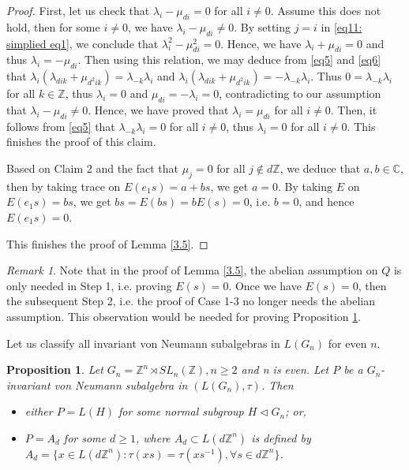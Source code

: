 \documentclass[12pt]{amsart}
\newtheorem{prop}[theorem]{Proposition}
\theoremstyle{definition}
\theoremstyle{remark}
\newtheorem{remark}[theorem]{Remark}
\begin{document}
\begin{proof}
First, let us check that $\lambda_i-\mu_{di}=0$ for all $i\neq 0$. Assume this does not hold, then for some $i\neq 0$, we have $\lambda_i-\mu_{di}\neq 0$. By setting $j=i$ in \eqref{eq11: simplied eq1}, we conclude that $\lambda_i^2-\mu_{di}^2=0$. Hence, we have $\lambda_i+\mu_{di}=0$ and thus $\lambda_i=-\mu_{di}$. Then using this relation, we may deduce from \eqref{eq5} and \eqref{eq6} that
$\lambda_i(\lambda_{dik}+\mu_{d^2ik})=\lambda_{-k}\lambda_i$ and $\lambda_i(\lambda_{dik}+\mu_{d^2ik})=-\lambda_{-k}\lambda_i$. Thus
$0=\lambda_{-k}\lambda_i$ for all $k\in\mathbb{Z}$, thus $\lambda_i=0$ and $\mu_{di}=-\lambda_i=0$, contradicting to our assumption that $\lambda_i-\mu_{di}\neq 0$. Hence, we have proved that $\lambda_i=\mu_{di}$ for all $i\neq 0$. Then, it follows from \eqref{eq5} that $\lambda_{-k}\lambda_i=0$ for all $i\neq 0$, thus $\lambda_i=0$ for all $i\neq 0$. This finishes the proof of this claim.

Based on Claim 2 and the fact that $\mu_j=0$ for all $j\not\in d\mathbb{Z}$, we deduce that $a, b\in\mathbb{C}$, then by taking trace on $E(e_1s)=a+bs$, we get $a=0$. By taking $E$ on $E(e_1s)=bs$, we get $bs=E(bs)=bE(s)=0$, i.e. $b=0$, and hence $E(e_1s)=0$. 

This finishes the proof of Lemma \ref{3.5}.
\end{proof}
\begin{remark}\label{remark: abelian assumption is used to show E(s)=0}
Note that in the proof of Lemma \ref{3.5}, the abelian assumption on $Q$ is only needed in Step 1, i.e. proving $E(s)=0$. Once we have $E(s)=0$, then the subsequent Step 2, i.e. the proof of Case 1-3 no longer needs the abelian assumption. This observation would be needed for proving Proposition \ref{prop: version of prop 3.2}. 
\end{remark}



Let us classify all invariant von Neumann subalgebras in $L(G_n)$ for even $n$.

\begin{prop}\label{prop: version of prop 3.2}
Let $G_{n}=\mathbb{Z}^n\rtimes SL_n(\mathbb{Z}),n\ge 2$ and n is even. Let $P$ be a $G_{n}$-invariant von Neumann subalgebra in $(L(G_{n}),\tau)$. Then 
\begin{itemize}
\item either $P=L(H)$ for some normal subgroup $H\lhd G_{n}$; or,
\item $P=A_d$ for some $d\geq 1$, where $A_d\subset L(d\mathbb{Z}^n)$ is defined by $A_d=\{x\in L(d\mathbb{Z}^n): \tau(xs)=\tau(xs^{-1}), \forall s\in d\mathbb{Z}^n\}$.
\end{itemize}
\end{prop}
\end{document}

